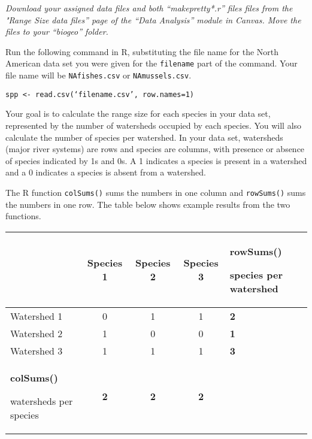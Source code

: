 \documentclass[11pt]{article}
\begin{document}
\textit{Download your assigned data files and both “makepretty*.r” files files from the "Range Size data files” page of the “Data Analysis” module in Canvas. Move the files to your “biogeo” folder.}

Run the following command in R, substituting the file name for the North American
data set you were given for the \texttt{filename} part of the command. Your file name 
will be \texttt{NAfishes.csv} or \texttt{NAmussels.csv}. 


\texttt{spp \textless{}-
read.csv(‘filename.csv’, row.names=1)}

%

Your goal is to calculate the range size for each species in your
data set, represented by the number of watersheds occupied by each
species. You will also calculate the number of species per watershed. In your 
data set, watersheds (major river systems) are rows and species are columns, with presence or absence of
species indicated by 1s and 0s. A 1 indicates a species is present in a
watershed and a 0 indicates a species is absent from a watershed.

The R function \texttt{colSums()} sums the numbers in one column and \texttt{rowSums()} 
sums the numbers in one row. The table below shows example results from the 
two functions.

\label{tab:colrowsums}
\begin{longtable}[c]{@{}L{1.5in}cccC{1.5in}@{}}
\toprule
& Species 1 & Species 2 & Species 3 & \textbf{rowSums()}

species per watershed\tabularnewline
\midrule
\endhead
Watershed 1 & 0 & 1 & 1 & \textbf{2}\tabularnewline
Watershed 2 & 1 & 0 & 0 & \textbf{1}\tabularnewline
Watershed 3 & 1 & 1 & 1 & \textbf{3}\tabularnewline
\textbf{colSums()}

watersheds per species & \textbf{2} & \textbf{2} & \textbf{2}
&\tabularnewline
\bottomrule
\end{longtable}
\end{document}
